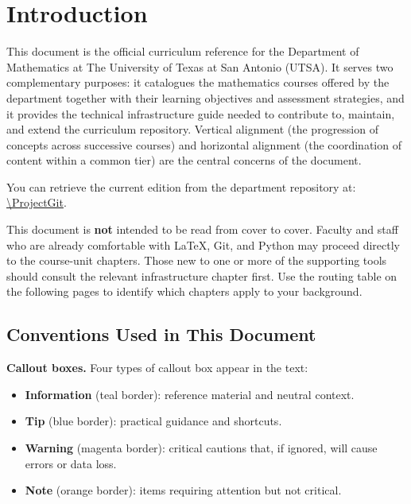 \chapter*{Introduction}

This document is the official curriculum reference for the Department of
Mathematics at The University of Texas at San Antonio (UTSA). It serves two
complementary purposes: it catalogues the mathematics courses offered by
the department together with their learning objectives and assessment
strategies, and it provides the technical infrastructure guide needed to
contribute to, maintain, and extend the curriculum repository. Vertical
alignment (the progression of concepts across successive courses) and
horizontal alignment (the coordination of content within a common tier)
are the central concerns of the document.

\noindent
You can retrieve the current edition from the department repository at:\\
\url{\ProjectGit}. \\

\begin{infobox}
This document is \textbf{not} intended to be read from cover to cover.
Faculty and staff who are already comfortable with \LaTeX{}, Git, and
Python may proceed directly to the course-unit chapters. Those new to
one or more of the supporting tools should consult the relevant
infrastructure chapter first. Use the routing table on the following
pages to identify which chapters apply to your background.
\end{infobox}

\section*{Conventions Used in This Document}

\noindent
\textbf{Callout boxes.} Four types of callout box appear in the text:

\begin{itemize}
    \item \textbf{Information} (teal border): reference material and
          neutral context.
    \item \textbf{Tip} (blue border): practical guidance and
          shortcuts.
    \item \textbf{Warning} (magenta border): critical cautions
          that, if ignored, will cause errors or data loss.
    \item \textbf{Note} (orange border): items requiring attention
          but not critical.
\end{itemize}

